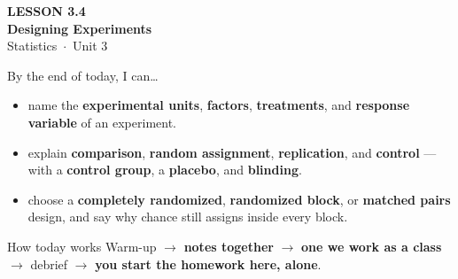 \documentclass[aspectratio=169, 11pt]{beamer}
\begin{document}
{
\begin{frame}[plain]
  \vspace{2.8cm}\hspace{0.55cm}%
  \begin{minipage}{0.9\textwidth}
    {\color{goldacc}\bfseries\small LESSON 3.4}\\[0.5cm]
    {\color{white}\bfseries\LARGE Designing Experiments}\\[1.2cm]
    {\color{skymid}\small Statistics~$\cdot$~Unit 3}
  \end{minipage}
\end{frame}
}

\newcommand{\redink}[1]{{\color{redacc}\bfseries #1}}

\begin{frame}[t, plain]
  By the end of today, I can\ldots
  \begin{itemize}\setlength{\itemsep}{5pt}
    \item name the \textbf{experimental units}, \textbf{factors}, \textbf{treatments}, and
          \textbf{response variable} of an experiment.
    \item explain \textbf{comparison}, \textbf{random assignment}, \textbf{replication}, and
          \textbf{control} --- with a \textbf{control group}, a \textbf{placebo}, and
          \textbf{blinding}.
    \item choose a \textbf{completely randomized}, \textbf{randomized block}, or
          \textbf{matched pairs} design, and say why chance still assigns inside every block.
  \end{itemize}
  \begin{block}{How today works}
    Warm-up $\to$ \textbf{notes together} $\to$ \textbf{one we work as a class} $\to$
    debrief $\to$ \textbf{you start the homework here, alone}.
  \end{block}
\end{frame}
\end{document}
